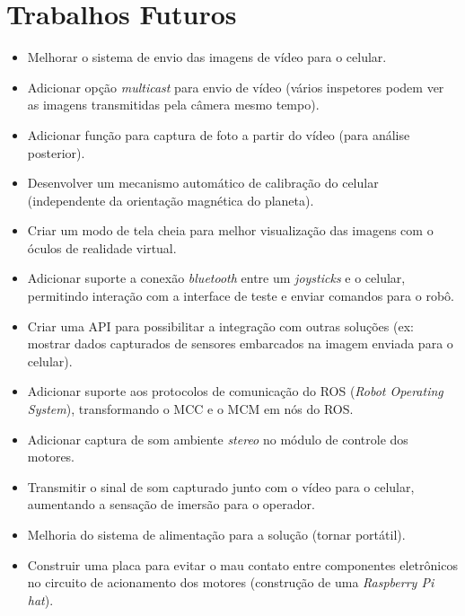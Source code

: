 \section{Trabalhos Futuros}
\label{sec:trabalhosFuturos}

\begin{itemize}
\item Melhorar o sistema de envio das imagens de vídeo para o celular.
\item Adicionar opção \textit{multicast} para envio de vídeo (vários inspetores podem ver as imagens transmitidas pela câmera mesmo tempo).
\item Adicionar função para captura de foto a partir do vídeo (para análise posterior).
\item Desenvolver um mecanismo automático de calibração do celular (independente da orientação magnética do planeta).
\item Criar um modo de tela cheia para melhor visualização das imagens com o óculos de realidade virtual.
\item Adicionar suporte a conexão \textit{bluetooth} entre um \textit{joysticks} e o celular, permitindo interação com a interface de teste e enviar comandos para o robô.
\item Criar uma API para possibilitar a integração com outras soluções (ex: mostrar dados capturados de sensores embarcados na imagem enviada para o celular).
\item Adicionar suporte aos protocolos de comunicação do ROS (\textit{Robot Operating System}), transformando o MCC e o MCM em nós do ROS. 
\item Adicionar captura de som ambiente \textit{stereo} no módulo de controle dos motores.
\item Transmitir o sinal de som capturado junto com o vídeo para o celular, aumentando a sensação de imersão para o operador.
\item Melhoria do sistema de alimentação para a solução (tornar portátil).
\item Construir uma placa para evitar o mau contato entre componentes eletrônicos no circuito de acionamento dos motores (construção de uma \textit{Raspberry Pi hat}).
\end{itemize}
